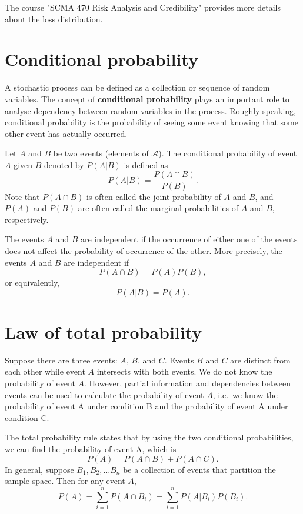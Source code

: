 \documentclass[
]{book}
\theoremstyle{definition}
\theoremstyle{definition}
\theoremstyle{definition}
\theoremstyle{definition}
\theoremstyle{remark}
\begin{document}
The course "SCMA 470 Risk Analysis and Credibility" provides more
details about the loss distribution.

\hypertarget{conditional-probability}{%
\section{Conditional probability}\label{conditional-probability}}

A stochastic process can be defined as a collection or sequence of
random variables. The concept of \textbf{conditional probability} plays an
important role to analyse dependency between random variables in the
process. Roughly speaking, conditional probability is the probability of
seeing some event knowing that some other event has actually occurred.

Let \(A\) and \(B\) be two events (elements of \(\mathcal{A}\)). The
conditional probability of event \(A\) given \(B\) denoted by \(P(A | B)\) is
defined as \[P(A|B) =  \frac{P(A \cap B)}{P(B)}.\] Note that
\(P(A \cap B)\) is often called the joint probability of \(A\) and \(B\), and
\(P(A)\) and \(P(B)\) are often called the marginal probabilities of \(A\) and
\(B\), respectively.

The events \(A\) and \(B\) are independent if the occurrence of either one
of the events does not affect the probability of occurrence of the
other. More precisely, the events \(A\) and \(B\) are independent if
\[P(A \cap B) = P(A)P(B),\] or equivalently, \[P(A|B) =  P(A).\]

\hypertarget{law-of-total-probability}{%
\section*{Law of total probability}\label{law-of-total-probability}}

Suppose there are three events: \(A\), \(B\), and \(C\). Events \(B\) and \(C\)
are distinct from each other while event \(A\) intersects with both
events. We do not know the probability of event \(A\). However, partial
information and dependencies between events can be used to calculate the
probability of event \(A\), i.e.~we know the probability of event A under
condition B and the probability of event A under condition C.

The total probability rule states that by using the two conditional
probabilities, we can find the probability of event A, which is
\[P(A) = P(A \cap B) + P(A \cap C).\] In general, suppose
\(B_1, B_2, \ldots B_n\) be a collection of events that partition the
sample space. Then for any event \(A\),
\[P(A) = \sum_{i = 1}^n   P(A \cap B_i )  = \sum_{i = 1}^n   P(A | B_i ) P(B_i) .\]
\end{document}
